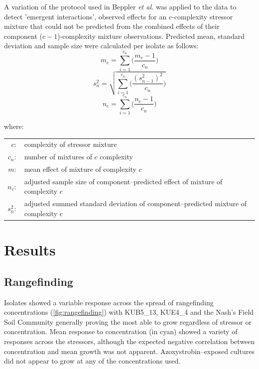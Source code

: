 \documentclass[final,1p,times]{elsarticle}
\begin{document}
A variation of the protocol used in Beppler \textit{et al.} \cite{Beppler2016} was applied to the data to detect 'emergent interactions', observed effects for an c-complexity stressor mixture that could not be predicted from the combined effects of their component ($c-1$)-complexity mixture observations. Predicted mean, standard deviation and sample size were calculated per isolate as follows: 
\begin{equation}
    m_c = \sum_{i = 1}^{c_n}\Big(\frac{m_c-1}{c_n}\Big)
\label{E:pred_mean}    
\end{equation}
\begin{equation}
    s^2_n = \sqrt{\sum_{i = 1}^{c_n}\bigg(\frac{(s^2_{n-1})^2}{c_n}\bigg)}
\label{E:pred_sd}    
\end{equation}
\begin{equation}
    n_c = \sum_{i = 1}^{c_n}\Big(\frac{n_c-1}{c_n}\Big)
\label{E:pred_n}    
\end{equation}

\noindent where:

\begin{small}
\setlength{\tabcolsep}{1pt}
\begin{tabular}{r p{11cm}}
    $c :$ & complexity of stressor mixture \\
    $c_n :$ & number of mixtures of $c$ complexity \\
    $m :$ & mean effect of mixture of complexity $c$ \\
    $n_c :$ & adjusted sample size of component--predicted effect of mixture of complexity $c$ \\
    $s^2_n :$ & adjusted summed standard deviation of component--predicted mixture of complexity $c$ \\
\end{tabular}
\end{small}

\section{Results}
\label{S:3}

\subsection{Rangefinding}
\label{S:3:1}

Isolates showed a variable response across the spread of rangefinding concentrations (\cref{fig:rangefinding}) with KUB5\_13, KUE4\_4 and the Nash's Field Soil Community generally proving the most able to grow regardless of stressor or concentration. Mean response to concentration (in cyan) showed a variety of responses across the stressors, although the expected negative correlation between concentration and mean growth was not apparent. Azoxystrobin--exposed cultures did not appear to grow at any of the concentrations used.
\end{document}
